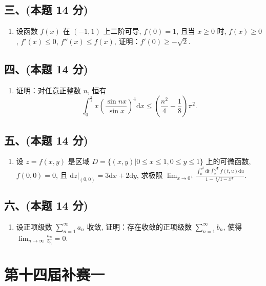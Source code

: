 \subsection*{三、(本题 14 分)}
\begin{enumerate}[start=7]
    \item 设函数 $f(x)$ 在 $(-1,  1)$ 上二阶可导, $f(0) = 1$, 且当 $x \geq 0$ 时, $f(x) \geq 0$, $f'(x) \leq 0$, $f''(x) \leq f(x)$, 证明：$f'(0) \geq -\sqrt{2}$.
\end{enumerate}

\subsection*{四、(本题 14 分)}
\begin{enumerate}[start=8]
    \item 证明：对任意正整数 $n$, 恒有
          \[ \int_{0}^{\frac{\pi}{2}} x \left( \frac{\sin nx}{\sin x} \right)^{4} \mathrm{d}x \leq \left( \frac{n^2}{4} - \frac{1}{8} \right) \pi^{2} .\]
\end{enumerate}

\subsection*{五、(本题 14 分)}
\begin{enumerate}[start=9]
    \item 设 $z = f(x,  y)$ 是区域 $D = \{(x,  y) | 0 \leq x \leq 1,  0 \leq y \leq 1\}$ 上的可微函数, $f(0,  0) = 0$, 且 $\mathrm{d}z|_{(0,  0)} = 3\mathrm{d}x + 2\mathrm{d}y$, 求极限
          $\displaystyle \lim_{x \to 0^{+}} \frac{\displaystyle\int_{0}^{x^{2}} \mathrm{d}t \int_{x}^{\sqrt{t}} f(t,  u) \mathrm{d}u}{1 - \sqrt[4]{1 - x^{4}}} $.
\end{enumerate}

\subsection*{六、(本题 14 分)}
\begin{enumerate}[start=10]
    \item 设正项级数 $\displaystyle\sum_{n=1}^{\infty} a_n$ 收敛, 证明：存在收敛的正项级数 $\displaystyle\sum_{n=1}^{\infty} b_n$, 使得
          $ \displaystyle\lim_{n \to \infty} \frac{a_n}{b_n} = 0 .$
\end{enumerate}


\newpage
\section{第十四届补赛一}

